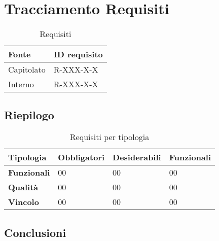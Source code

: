 \section{Tracciamento Requisiti}
\begin{table}[H]
\centering
    \begin{tabular}{|C{3.0cm}|C{3.0cm}|}
        \hline
         \textbf{Fonte} &
         \textbf{ID requisito}   
          \\
          \hline
          Capitolato & R-XXX-X-X \\
          \hline 
          Interno & R-XXX-X-X \\
          \hline
    \end{tabular}
     \caption{Requisiti}
\end{table}
\subsection{Riepilogo}
\begin{table}[H]
\centering
    \begin{tabular}{|C{3.0cm}|C{2.5cm}|C{2.5cm}|C{2.5cm}|}
        \hline
         \textbf{Tipologia} &
         \textbf{Obbligatori} & 
         \textbf{Desiderabili} &
         \textbf{Funzionali} 
          \\
          \hline
          \textbf{Funzionali} & 00 & 00 & 00 \\
          \hline 
          \textbf{Qualità} & 00 & 00 & 00\\
          \hline
          \textbf{Vincolo} & 00 & 00 & 00\\
          \hline
    \end{tabular}
    \caption{Requisiti per tipologia}
\end{table}
\subsection{Conclusioni}